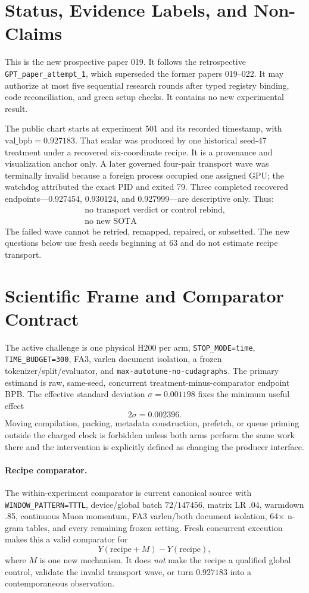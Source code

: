 \documentclass{article}
\newcommand{\valbpb}{\mathrm{val\_bpb}}
\begin{document}
\section{Status, Evidence Labels, and Non-Claims}

This is the new prospective paper 019.  It follows the retrospective
\texttt{GPT\_paper\_attempt\_1}, which superseded the former papers 019--022.
It may authorize at most five sequential research rounds after typed registry
binding, code reconciliation, and green setup checks.  It contains no new
experimental result.

The public chart starts at experiment 501 and its recorded timestamp, with
$\valbpb=0.927183$.  That scalar was produced by one historical seed-47
treatment under a recovered six-coordinate recipe.  It is a provenance and
visualization anchor only.  A later governed four-pair transport wave was
terminally invalid because a foreign process occupied one assigned GPU; the
watchdog attributed the exact PID and exited 79.  Three completed recovered
endpoints---0.927454, 0.930124, and 0.927999---are descriptive only.  Thus:
\[
\boxed{\begin{gathered}
\text{no transport verdict or control rebind,}\\[-2pt]
\text{no new SOTA}
\end{gathered}}
\]
The failed wave cannot be retried, remapped, repaired, or subsetted.  The new
questions below use fresh seeds beginning at 63 and do not estimate recipe
transport.

\section{Scientific Frame and Comparator Contract}

The active challenge is one physical H200 per arm,
\texttt{STOP\_MODE=time}, \texttt{TIME\_BUDGET=300}, FA3, varlen document
isolation, a frozen tokenizer/split/evaluator, and
\texttt{max-autotune-no-cudagraphs}.  The primary estimand is raw,
same-seed, concurrent treatment-minus-comparator endpoint BPB.  The effective
standard deviation $\sigma=0.001198$ fixes the minimum useful effect
\[
                         2\sigma=0.002396.
\]
Moving compilation, packing, metadata construction, prefetch, or queue
priming outside the charged clock is forbidden unless both arms perform the
same work there and the intervention is explicitly defined as changing the
producer interface.

\paragraph{Recipe comparator.}
The within-experiment comparator is current canonical source with
\texttt{WINDOW\_PATTERN=TTTL}, device/global batch $72/147456$, matrix LR
.04, warmdown .85, continuous Muon momentum, FA3 varlen/both document
isolation, 64$\times$ n-gram tables, and every remaining frozen setting.
Fresh concurrent execution makes this a valid comparator for
\[
Y(\text{recipe}+M)-Y(\text{recipe}),
\]
where $M$ is one new mechanism.  It does \emph{not} make the recipe a
qualified global control, validate the invalid transport wave, or turn
$0.927183$ into a contemporaneous observation.
\end{document}
